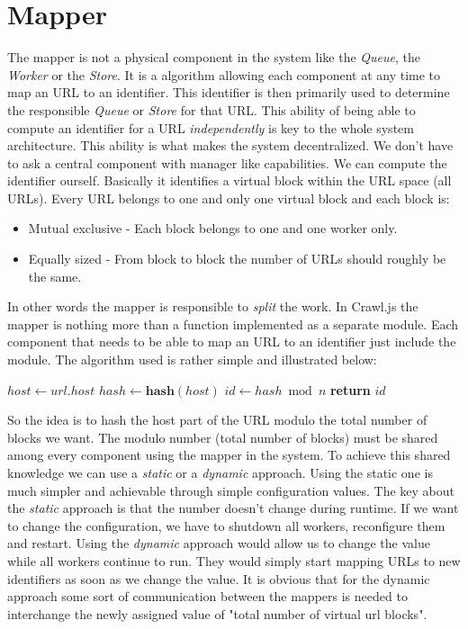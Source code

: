 \section{Mapper}
\label{mapper}
The mapper is not a physical component in the system like the \emph{Queue}, the \emph{Worker} or the \emph{Store}. It is a algorithm allowing each component at any time to map an URL to an identifier. This identifier is then primarily used to determine the responsible \emph{Queue} or \emph{Store} for that URL.
This ability of being able to compute an identifier for a URL \emph{independently} is key to the whole system architecture. This ability is what makes the system decentralized. We don't have to ask a central component with manager like capabilities. We can compute the identifier ourself. Basically it identifies a virtual block within the URL space (all URLs). Every URL belongs to one and only one virtual block and each block is:
\begin{itemize}
  \item Mutual exclusive - Each block belongs to one and one worker only.
  \item Equally sized - From block to block the number of URLs should roughly be the same.
\end{itemize}

In other words the mapper is responsible to \emph{split} the work. In Crawl.js the mapper is nothing more than a function implemented as a separate module. Each component that needs to be able to map an URL to an identifier just include the module. The algorithm used is rather simple and illustrated below:
\begin{algorithmic}[0]
\State $host \gets url.host$
\State $hash \gets \textbf{hash}(host)$
\State $id \gets hash \bmod n$
\State \textbf{return} $id$
\EndFunction
\end{algorithmic}

So the idea is to hash the host part of the URL modulo the total number of blocks we want. The modulo number (total number of blocks) must be shared among every component using the mapper in the system.
To achieve this shared knowledge we can use a \emph{static} or a \emph{dynamic} approach. Using the static one is much simpler and achievable through simple configuration values. The key about the \emph{static} approach is that the number doesn't change during runtime. If we want to change the configuration, we have to shutdown all workers, reconfigure them and restart. Using the \emph{dynamic} approach would allow us to change the value while all workers continue to run. They would simply start mapping URLs to new identifiers as soon as we change the value. It is obvious that for the dynamic approach some sort of communication between the mappers is needed to interchange the newly assigned value of "total number of virtual url blocks".

